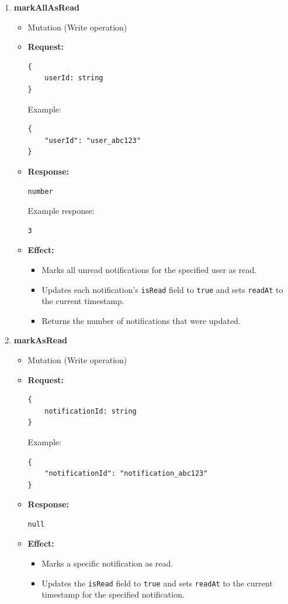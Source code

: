 \documentclass[a4paper,12pt]{article}
\begin{document}
\begin{enumerate}
    \item \textbf{markAllAsRead}
    \begin{itemize}
        \item Mutation (Write operation)
        \item \textbf{Request:}
        \begin{verbatim}
{
    userId: string
}
        \end{verbatim}
        Example:
        \begin{verbatim}
{
    "userId": "user_abc123"
}
        \end{verbatim}
        \item \textbf{Response:}
        \begin{verbatim}
number
        \end{verbatim}
        Example response:
        \begin{verbatim}
3
        \end{verbatim}
        \item \textbf{Effect:}
        \begin{itemize}
            \item Marks all unread notifications for the specified user as read.
            \item Updates each notification's \texttt{isRead} field to \texttt{true} and sets \texttt{readAt} to the current timestamp.
            \item Returns the number of notifications that were updated.
        \end{itemize}
    \end{itemize}

    \item \textbf{markAsRead}
    \begin{itemize}
        \item Mutation (Write operation)
        \item \textbf{Request:}
        \begin{verbatim}
{
    notificationId: string
}
        \end{verbatim}
        Example:
        \begin{verbatim}
{
    "notificationId": "notification_abc123"
}
        \end{verbatim}
        \item \textbf{Response:}
        \begin{verbatim}
null
        \end{verbatim}
        \item \textbf{Effect:}
        \begin{itemize}
            \item Marks a specific notification as read.
            \item Updates the \texttt{isRead} field to \texttt{true} and sets \texttt{readAt} to the current timestamp for the specified notification.
        \end{itemize}
    \end{itemize}


\end{enumerate}
\end{document}
